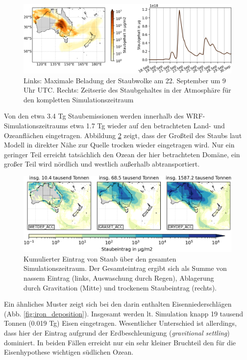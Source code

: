 \documentclass[12pt,a4paper,onecolumn,headheight=30pt]{scrartcl}
\begin{document}
\begin{figure}[htbp]
\includegraphics[width=\textwidth]{bilder/dustload_time.png}
\caption{Links: Maximale Beladung der Staubwolke am 22. September um 9 Uhr UTC. Rechts: Zeitserie des Staubgehaltes in der Atmosphäre für den kompletten Simulationszeitraum} \label{fig:dustload_time}
\end{figure}
Von den etwa 3.4 Tg Staubemissionen werden innerhalb des WRF-Simulationszeitraums etwa 1.7 Tg wieder auf den betrachteten Land- und Ozeanflächen eingetragen. Abbildung \ref{fig:deposition} zeigt, dass der Großteil des Staubs laut Modell in direkter Nähe zur Quelle trocken wieder eingetragen wird. Nur ein geringer Teil erreicht tatsächlich den Ozean der hier betrachteten Domäne, ein großer Teil wird nördlich und westlich außerhalb abtransportiert. 
\begin{figure}[htbp]
\includegraphics[width=\textwidth]{bilder/dust_deposition_vars.png}
\caption{Kumulierter Eintrag von Staub über den gesamten Simulationszeitraum. Der Gesamteintrag ergibt sich als Summe von nassem Eintrag (links, Auswaschung durch Regen), Ablagerung durch Gravitation (Mitte) und trockenem Staubeintrag (rechts).} \label{fig:deposition}
\end{figure}
Ein ähnliches Muster zeigt sich bei den darin enthalten Eisenniederschlägen (Abb. \ref{fig:iron_deposition}). Insgesamt werden lt. Simulation knapp 19 tausend Tonnen (0.019 Tg) Eisen eingetragen. Wesentlicher Unterschied ist allerdings, dass hier der Eintrag aufgrund der Erdbeschleunigung (\textit{gravitional settling}) dominiert.  In beiden Fällen erreicht nur ein sehr kleiner Bruchteil den für die Eisenhypothese wichtigen südlichen Ozean.
\end{document}
